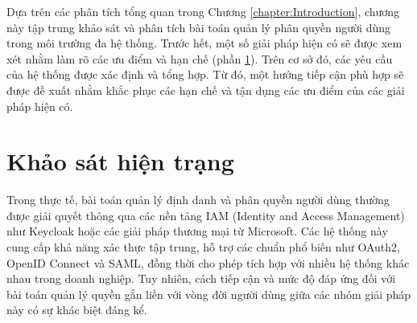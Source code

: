\documentclass[../DoAn.tex]{subfiles}
\begin{document}



Dựa trên các phân tích tổng quan trong Chương \ref{chapter:Introduction}, chương này tập trung khảo sát và phân tích bài toán quản lý phân quyền người dùng trong môi trường đa hệ thống. Trước hết, một số giải pháp hiện có sẽ được xem xét nhằm làm rõ các ưu điểm và hạn chế (phần \ref{section:2.1}). Trên cơ sở đó, các yêu cầu của hệ thống được xác định và tổng hợp. Từ đó, một hướng tiếp cận phù hợp sẽ được đề xuất nhằm khắc phục các hạn chế và tận dụng các ưu điểm của các giải pháp hiện có.


\section{Khảo sát hiện trạng}
\label{section:2.1}
Trong thực tế, bài toán quản lý định danh và phân quyền người dùng thường được giải quyết thông qua các nền tảng IAM (Identity and Access Management) như Keycloak hoặc các giải pháp thương mại từ Microsoft. Các hệ thống này cung cấp khả năng xác thực tập trung, hỗ trợ các chuẩn phổ biến như OAuth2, OpenID Connect và SAML, đồng thời cho phép tích hợp với nhiều hệ thống khác nhau trong doanh nghiệp. Tuy nhiên, cách tiếp cận và mức độ đáp ứng đối với bài toán quản lý quyền gắn liền với vòng đời người dùng giữa các nhóm giải pháp này có sự khác biệt đáng kể.
\end{document}
